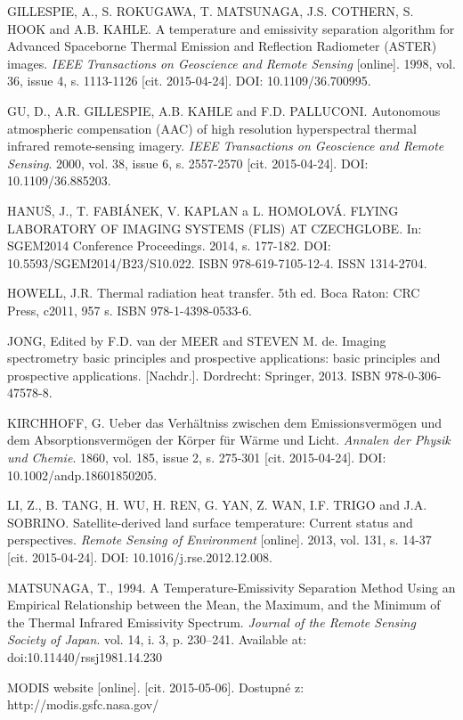 \begin{thebibliography}{10}
 GILLESPIE, A., S. ROKUGAWA, T. MATSUNAGA, J.S. COTHERN, S. HOOK and A.B. KAHLE. A temperature and emissivity separation algorithm for Advanced Spaceborne Thermal Emission and Reflection Radiometer (ASTER) images. \textit{IEEE Transactions on Geoscience and Remote Sensing} [online]. 1998, vol. 36, issue 4, s. 1113-1126 [cit. 2015-04-24]. DOI: 10.1109/36.700995.

 GU, D., A.R. GILLESPIE, A.B. KAHLE and F.D. PALLUCONI. Autonomous atmospheric compensation (AAC) of high resolution hyperspectral thermal infrared remote-sensing imagery. \textit{IEEE Transactions on Geoscience and Remote Sensing}. 2000, vol. 38, issue 6, s. 2557-2570 [cit. 2015-04-24]. DOI: 10.1109/36.885203.

 HANUŠ, J., T. FABIÁNEK, V. KAPLAN a L. HOMOLOVÁ. FLYING LABORATORY OF IMAGING SYSTEMS (FLIS) AT CZECHGLOBE. In: SGEM2014 Conference Proceedings. 2014, s. 177-182. DOI: 10.5593/SGEM2014/B23/S10.022. ISBN 978-619-7105-12-4. ISSN 1314-2704.

 HOWELL, J.R. Thermal radiation heat transfer. 5th ed. Boca Raton: CRC Press, c2011, 957 s. ISBN 978-1-4398-0533-6.

 JONG, Edited by F.D. van der MEER and STEVEN M. de. Imaging spectrometry basic principles and prospective applications: basic principles and prospective applications. [Nachdr.]. Dordrecht: Springer, 2013. ISBN 978-0-306-47578-8.

 KIRCHHOFF, G. Ueber das Verhältniss zwischen dem Emissionsvermögen und dem Absorptionsvermögen der Körper für Wärme und Licht. \textit{Annalen der Physik und Chemie}. 1860, vol. 185, issue 2, s. 275-301 [cit. 2015-04-24]. DOI: 10.1002/andp.18601850205.

 LI, Z., B. TANG, H. WU, H. REN, G. YAN, Z. WAN, I.F. TRIGO and J.A. SOBRINO. Satellite-derived land surface temperature: Current status and perspectives. \textit{Remote Sensing of Environment} [online]. 2013, vol. 131, s. 14-37 [cit. 2015-04-24]. DOI: 10.1016/j.rse.2012.12.008.

 MATSUNAGA, T., 1994. A Temperature-Emissivity Separation Method Using an Empirical Relationship between the Mean, the Maximum, and the Minimum of the Thermal Infrared Emissivity Spectrum. \textit{Journal of the Remote Sensing Society of Japan}. vol. 14, i. 3, p. 230–241. Available at: doi:10.11440/rssj1981.14.230

 MODIS website [online]. [cit. 2015-05-06]. Dostupné z: http://modis.gsfc.nasa.gov/


\end{thebibliography}
